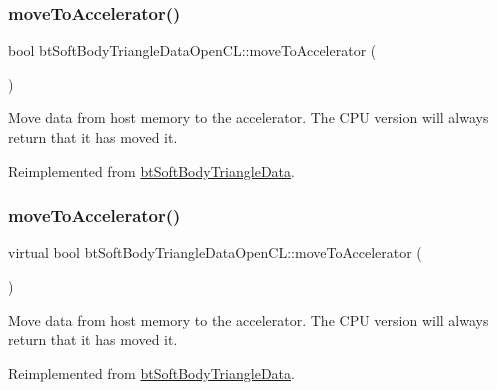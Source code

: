 \subsubsection{\texorpdfstring{move\+To\+Accelerator()}{moveToAccelerator()}\hspace{0.1cm}{\footnotesize\ttfamily [1/2]}}
{\footnotesize\ttfamily bool bt\+Soft\+Body\+Triangle\+Data\+Open\+C\+L\+::move\+To\+Accelerator (\begin{DoxyParamCaption}{ }\end{DoxyParamCaption})\hspace{0.3cm}{\ttfamily [virtual]}}

Move data from host memory to the accelerator. The C\+PU version will always return that it has moved it. 

Reimplemented from \hyperlink{classbtSoftBodyTriangleData_a64a1971c6c64d80cc8cd488cb11208a6}{bt\+Soft\+Body\+Triangle\+Data}.

\mbox{\label{classbtSoftBodyTriangleDataOpenCL_a7b9ed62bd458f1397041d6e6bdae44bb}} 
\subsubsection{\texorpdfstring{move\+To\+Accelerator()}{moveToAccelerator()}\hspace{0.1cm}{\footnotesize\ttfamily [2/2]}}
{\footnotesize\ttfamily virtual bool bt\+Soft\+Body\+Triangle\+Data\+Open\+C\+L\+::move\+To\+Accelerator (\begin{DoxyParamCaption}{ }\end{DoxyParamCaption})\hspace{0.3cm}{\ttfamily [virtual]}}

Move data from host memory to the accelerator. The C\+PU version will always return that it has moved it. 

Reimplemented from \hyperlink{classbtSoftBodyTriangleData_a64a1971c6c64d80cc8cd488cb11208a6}{bt\+Soft\+Body\+Triangle\+Data}.

\mbox{\label{classbtSoftBodyTriangleDataOpenCL_a076bbaf97478a0756c25bf887e6bba1b}} 
